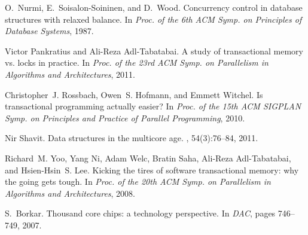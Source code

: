 \begin{thebibliography}{99}
{
O.~Nurmi, E.~Soisalon-Soininen, and D.~Wood.
\newblock Concurrency control in database structures with relaxed balance.
\newblock In {\em Proc. of the 6th ACM Symp. on Principles of Database
  Systems}, 1987.

% 



Victor Pankratius and Ali-Reza Adl-Tabatabai.
\newblock A study of transactional memory vs. locks in practice.
\newblock In {\em Proc. of the 23rd ACM Symp. on Parallelism in Algorithms and
  Architectures}, 2011.

Christopher~J. Rossbach, Owen~S. Hofmann, and Emmett Witchel.
\newblock Is transactional programming actually easier?
\newblock In {\em Proc. of the 15th ACM SIGPLAN Symp. on Principles and
  Practice of Parallel Programming}, 2010.

Nir Shavit.
\newblock Data structures in the multicore age.
, 54(3):76--84, 2011.

% 


Richard~M. Yoo, Yang Ni, Adam Welc, Bratin Saha, Ali-Reza Adl-Tabatabai, and
  Hsien-Hsin~S. Lee.
\newblock Kicking the tires of software transactional memory: why the going
  gets tough.
\newblock In {\em Proc. of the 20th ACM Symp. on Parallelism in Algorithms and
  Architectures}, 2008.









S.~Borkar.
\newblock Thousand core chips: a technology perspective.
\newblock In {\em DAC}, pages 746--749, 2007.




}
\end{thebibliography}
